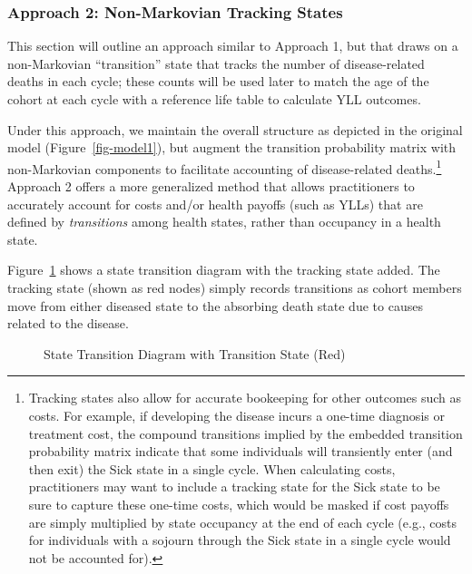 \documentclass[
]{agujournal2019}
\begin{document}
\subsubsection{Approach 2: Non-Markovian Tracking
States}\label{approach-2-non-markovian-tracking-states}

This section will outline an approach similar to Approach 1, but that
draws on a non-Markovian ``transition'' state that tracks the number of
disease-related deaths in each cycle; these counts will be used later to
match the age of the cohort at each cycle with a reference life table to
calculate YLL outcomes.

Under this approach, we maintain the overall structure as depicted in
the original model (Figure~\ref{fig-model1}), but augment the transition
probability matrix with non-Markovian components to facilitate
accounting of disease-related deaths.\footnote{Tracking states also
  allow for accurate bookeeping for other outcomes such as costs. For
  example, if developing the disease incurs a one-time diagnosis or
  treatment cost, the compound transitions implied by the embedded
  transition probability matrix indicate that some individuals will
  transiently enter (and then exit) the Sick state in a single cycle.
  When calculating costs, practitioners may want to include a tracking
  state for the Sick state to be sure to capture these one-time costs,
  which would be masked if cost payoffs are simply multiplied by state
  occupancy at the end of each cycle (e.g., costs for individuals with a
  sojourn through the Sick state in a single cycle would not be
  accounted for).} Approach 2 offers a more generalized method that
allows practitioners to accurately account for costs and/or health
payoffs (such as YLLs) that are defined by \emph{transitions} among
health states, rather than occupancy in a health state.

Figure~\ref{fig-transition} shows a state transition diagram with the
tracking state added. The tracking state (shown as red nodes) simply
records transitions as cohort members move from either diseased state to
the absorbing death state due to causes related to the disease.

\begin{figure}


\caption{\label{fig-transition}State Transition Diagram with Transition
State (Red)}

\end{figure}%
\end{document}
